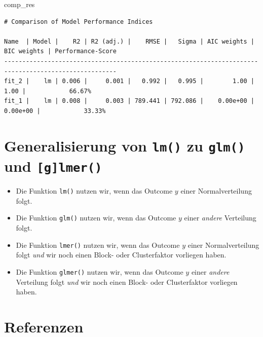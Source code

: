 \documentclass[
  letterpaper,
]{scrbook}
\newenvironment{Shaded}{\begin{snugshade}}{\end{snugshade}}
\newcommand{\NormalTok}[1]{\textcolor[rgb]{0.00,0.23,0.31}{#1}}
\providecommand{\tightlist}{%
  \setlength{\itemsep}{0pt}\setlength{\parskip}{0pt}}\usepackage{longtable,booktabs,array}
\begin{document}
\begin{Shaded}
\begin{Highlighting}[]
\NormalTok{comp\_res}
\end{Highlighting}
\end{Shaded}

\begin{verbatim}
# Comparison of Model Performance Indices

Name  | Model |    R2 | R2 (adj.) |    RMSE |   Sigma | AIC weights | BIC weights | Performance-Score
-----------------------------------------------------------------------------------------------------
fit_2 |    lm | 0.006 |     0.001 |   0.992 |   0.995 |        1.00 |        1.00 |            66.67%
fit_1 |    lm | 0.008 |     0.003 | 789.441 | 792.086 |    0.00e+00 |    0.00e+00 |            33.33%
\end{verbatim}

\hypertarget{generalisierung-von-lm-zu-glm-und-glmer}{%
\section{\texorpdfstring{Generalisierung von \texttt{lm()} zu
\texttt{glm()} und
\texttt{{[}g{]}lmer()}}{Generalisierung von lm() zu glm() und {[}g{]}lmer()}}\label{generalisierung-von-lm-zu-glm-und-glmer}}

\begin{itemize}
\tightlist
\item
  Die Funktion \texttt{lm()} nutzen wir, wenn das Outcome \(y\) einer
  Normalverteilung folgt.
\item
  Die Funktion \texttt{glm()} nutzen wir, wenn das Outcome \(y\) einer
  \emph{andere} Verteilung folgt.
\item
  Die Funktion \texttt{lmer()} nutzen wir, wenn das Outcome \(y\) einer
  Normalverteilung folgt \emph{und} wir noch einen Block- oder
  Clusterfaktor vorliegen haben.
\item
  Die Funktion \texttt{glmer()} nutzen wir, wenn das Outcome \(y\) einer
  \emph{andere} Verteilung folgt \emph{und} wir noch einen Block- oder
  Clusterfaktor vorliegen haben.
\end{itemize}

\hypertarget{referenzen-6}{%
\section*{Referenzen}\label{referenzen-6}}
\end{document}
